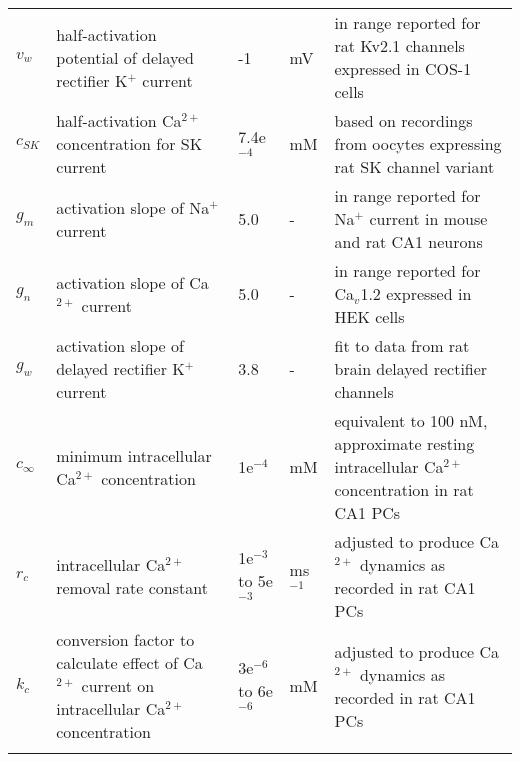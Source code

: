\documentclass[10pt,letterpaper]{article}
\newcommand{\Ca}{Ca$^{2+}$}
\newcommand{\K}{K$^{+}$}
\newcommand{\Na}{Na$^{+}$}
\begin{document}
\begin{footnotesize}
\begin{longtable}{l >{\raggedright\arraybackslash}p{} p{} l >{\raggedright\arraybackslash}p{}}
$v_{w}$ & half-activation potential of delayed rectifier {\K} current & -1 & mV & in range reported for rat Kv2.1 channels expressed in COS-1 cells \cite{murakoshi1999identification} \\
$c_{SK}$ & half-activation {\Ca} concentration for SK current & 7.4e$^{-4}$ & mM & based on recordings from oocytes expressing rat SK channel variant \cite{hirschberg1998gating} \\
$g_{m}$ & activation slope of {\Na} current & 5.0 & - & in range reported for {\Na} current in mouse \cite{carter2012transient} and rat \cite{costa1996kinetic} CA1 neurons \\
$g_{n}$ & activation slope of {\Ca} current & 5.0 & - & in range reported for Ca$_v$1.2 expressed in HEK cells \cite{shin2021sites}\\
$g_{w}$ & activation slope of delayed rectifier {\K} current & 3.8& - & fit to data from rat brain delayed rectifier channels \cite{vandongen1990alteration} \\
$c_{\infty}$ & minimum intracellular {\Ca} concentration & 1e$^{-4}$ & mM & equivalent to 100 nM, approximate resting intracellular {\Ca} concentration in rat CA1 PCs \cite{oh2013altered,magee1996dihydropyridine,gant2006early} \\
$r_{c}$ & intracellular {\Ca} removal rate constant &  1e$^{-3}$ \newline to \newline 5e$^{-3}$ & ms$^{-1}$ & adjusted to produce {\Ca} dynamics as recorded in rat CA1 PCs \cite{oh2013altered} \\
$k_{c}$ & conversion factor to calculate effect of {\Ca} current on intracellular {\Ca} concentration & 3e$^{-6}$ \newline to \newline 6e$^{-6}$ & mM & adjusted to produce {\Ca} dynamics as recorded in rat CA1 PCs \cite{oh2013altered} \\
\bottomrule 
\rowcolor{white}
\label{tab:params}
\end{longtable}
\end{footnotesize}

\vspace{-0.5cm}
\end{document}
